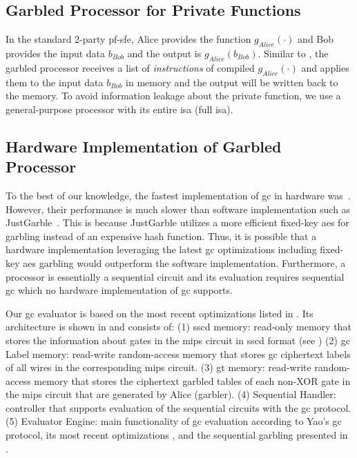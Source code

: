 \subsection{Garbled Processor for Private Functions} \label{ssec:processor-mips-sfe-private}
In the standard 2-party \acrshort{pf-sfe}, Alice provides the function $g_{Alice}(\cdot)$ and Bob provides the input data $b_{Bob}$ and the output is $g_{Alice}(b_{Bob})$.
Similar to , the garbled processor receives a list of \emph{instructions} of compiled $g_{Alice}(\cdot)$ and applies them to the input data $b_{Bob}$ in memory and the output will be written back to the memory.
To avoid information leakage about the private function, we use a general-purpose processor with its entire \acrshort{isa} (full \acrshort{isa}).

\subsection{Hardware Implementation of Garbled Processor} \label{ssec:processor-hardware}
To the best of our knowledge, the fastest implementation of \acrshort{gc} in hardware was~\cite{jarvinen2010garbled}.
However, their performance is much slower than software implementation such as JustGarble~\cite{bellare2013efficient}.
This is because JustGarble utilizes a more efficient fixed-key \acrshort{aes} for garbling instead of an expensive hash function.
Thus, it is possible that a hardware implementation leveraging the latest \acrshort{gc} optimizations including fixed-key \acrshort{aes} garbling would outperform the software implementation.
Furthermore, a processor is essentially a sequential circuit and its evaluation requires sequential \acrshort{gc} which no hardware implementation of \acrshort{gc} supports.

Our \acrshort{gc} evaluator is based on the most recent optimizations listed in .
Its architecture is shown in  and consists of:
(1) \acrfull{sscd} memory: read-only memory that stores the information about gates in the \gls{mips} circuit in \acrshort{sscd} format (see )
(2) \acrshort{gc} Label memory: read-write random-access memory that stores \acrshort{gc} ciphertext labels of all wires in the corresponding \gls{mips} circuit.
(3) \acrfull{gt} memory: read-write random-access memory that stores the ciphertext garbled tables of each non-XOR gate in the \gls{mips} circuit that are generated by Alice (garbler).
(4) Sequential Handler: controller that supports evaluation of the sequential circuits with the \acrshort{gc} protocol.
(5) Evaluator Engine: main functionality of \acrshort{gc} evaluation according to Yao's \acrshort{gc} protocol, its most recent optimizations \cite{kolesnikov2008improved, bellare2013efficient, zahur2015two}, and the sequential garbling presented in .

